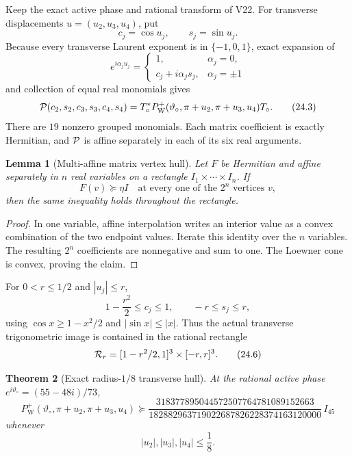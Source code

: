 \documentclass[11pt,oneside]{article}
\newtheorem{theorem}{Theorem}[section]
\newtheorem{lemma}[theorem]{Lemma}
\theoremstyle{definition}
\theoremstyle{remark}
\begin{document}
Keep the exact active phase and rational transform of V22.  For
transverse displacements \(u=(u_2,u_3,u_4)\), put
\[
 c_j=\cos u_j,\qquad s_j=\sin u_j.                       \tag{24.1}
\]
Because every transverse Laurent exponent is in
\(\{-1,0,1\}\), exact expansion of
\[
 e^{i\alpha_ju_j}=
 \begin{cases}
 1,&\alpha_j=0,\\
 c_j+i\alpha_js_j,&\alpha_j=\pm1
 \end{cases}                                             \tag{24.2}
\]
and collection of equal real monomials gives
\[
 {\cal P}(c_2,s_2,c_3,s_3,c_4,s_4)
 =T_\circ^*P_{\mathrm W}^+
  (\vartheta_\circ,\pi+u_2,\pi+u_3,u_4)T_\circ.          \tag{24.3}
\]
There are \(19\) nonzero grouped monomials.  Each matrix coefficient
is exactly Hermitian, and \({\cal P}\) is affine separately in each
of its six real arguments.

\begin{lemma}[Multi-affine matrix vertex hull]
\label{lem:newv24-hull}
Let \(F\) be Hermitian and affine separately in \(n\) real variables
on a rectangle \(I_1\times\cdots\times I_n\).  If
\[
 F(v)\succeq\eta I
 \quad\text{at every one of the }2^n\text{ vertices }v,  \tag{24.4}
\]
then the same inequality holds throughout the rectangle.
\end{lemma}

\begin{proof}
In one variable, affine interpolation writes an interior value as a
convex combination of the two endpoint values.  Iterate this
identity over the \(n\) variables.  The resulting \(2^n\)
coefficients are nonnegative and sum to one.  The Loewner cone is
convex, proving the claim.
\end{proof}

For \(0<r\le1/2\) and \(|u_j|\le r\),
\[
 1-\frac{r^2}{2}\le c_j\le1,\qquad -r\le s_j\le r,       \tag{24.5}
\]
using \(\cos x\ge1-x^2/2\) and \(|\sin x|\le|x|\).
Thus the actual transverse trigonometric image is contained in the
rational rectangle
\[
 {\cal R}_r=
 [1-r^2/2,1]^3\times[-r,r]^3.                           \tag{24.6}
\]

\begin{theorem}[Exact radius-\(1/8\) transverse hull]
\label{thm:newv24-hull}
At the rational active phase \(e^{i\vartheta_\circ}=(55-48i)/73\),
\[
 P_{\mathrm W}^+
 (\vartheta_\circ,\pi+u_2,\pi+u_3,u_4)
 \succeq
 \frac{
318377895044572507764781089152663}
{182882963719022687826228374163120000}\,I_{45}           \tag{24.7}
\]
whenever
\[
 |u_2|,|u_3|,|u_4|\le\frac18.                           \tag{24.8}
\]
\end{theorem}
\end{document}
